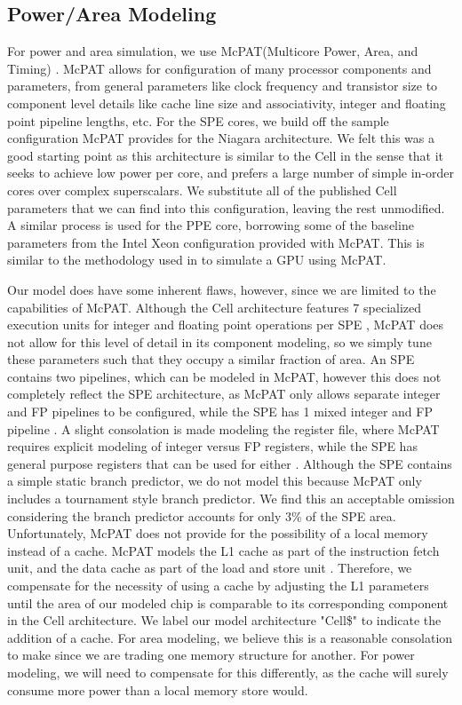\documentclass{sig-alternate-05-2015}
\begin{document}
\subsection{Power/Area Modeling}

For power and area simulation, we use McPAT(Multicore Power, Area, and Timing) \cite{li2009mcpat}. McPAT allows for configuration of many processor components and parameters, from general parameters like clock frequency and transistor size to component level details like cache line size and associativity, integer and floating point pipeline lengths, etc. For the SPE cores, we build off the sample configuration McPAT provides for the Niagara architecture. We felt this was a good starting point as this architecture is similar to the Cell in the sense that it seeks to achieve low power per core, and prefers a large number of simple in-order cores over complex superscalars. We substitute all of the published Cell parameters that we can find into this configuration, leaving the rest unmodified. A similar process is used for the PPE core, borrowing some of the baseline parameters from the Intel Xeon configuration provided with McPAT. This is similar to the methodology used in \cite{pham2005design} to simulate a GPU using McPAT.

Our model does have some inherent flaws, however, since we are limited to the capabilities of McPAT. Although the Cell architecture features 7 specialized execution units for integer and floating point operations per SPE \cite{flachs2006microarchitecture}, McPAT does not allow for this level of detail in its component modeling, so we simply tune these parameters such that they occupy a similar fraction of area. An SPE contains two pipelines, which can be modeled in McPAT, however this does not completely reflect the SPE architecture, as McPAT only allows separate integer and FP pipelines to be configured, while the SPE has 1 mixed integer and FP pipeline \cite{flachs2006microarchitecture}. A slight consolation is made modeling the register file, where McPAT requires explicit modeling of integer versus FP registers, while the SPE has general purpose registers that can be used for either \cite{flachs2006microarchitecture}. Although the SPE contains a simple static branch predictor, we do not model this because McPAT only includes a tournament style branch predictor. We find this an acceptable omission considering the branch predictor accounts for only 3\% of the SPE area. Unfortunately, McPAT does not provide for the possibility of a local memory instead of a cache. McPAT models the L1 cache as part of the instruction fetch unit, and the data cache as part of the load and store unit \cite{li2009mcpat}. Therefore, we compensate for the necessity of using a cache by adjusting the L1 parameters until the area of our modeled chip is comparable to its corresponding component in the Cell architecture. We label our model architecture "Cell\$" to indicate the addition of a cache. For area modeling, we believe this is a reasonable consolation to make since we are trading one memory structure for another. For power modeling, we will need to compensate for this differently, as the cache will surely consume more power than a local memory store would.
\end{document}
